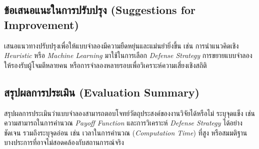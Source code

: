 \subsection{ข้อเสนอแนะในการปรับปรุง (Suggestions for Improvement)}
เสนอแนวทางปรับปรุงเพื่อให้แบบจำลองมีความยืดหยุ่นและแม่นยำยิ่งขึ้น เช่น  
การนำแนวคิดเชิง \textit{Heuristic} หรือ \textit{Machine Learning} มาใช้ในการเลือก \textit{Defense Strategy}  
การขยายแบบจำลองให้รองรับผู้โจมตีหลายคน หรือการจำลองหลายรอบเพื่อวิเคราะห์ความเสี่ยงเชิงสถิติ

\subsection{สรุปผลการประเมิน (Evaluation Summary)}
สรุปผลการประเมินว่าแบบจำลองสามารถตอบโจทย์วัตถุประสงค์ของงานวิจัยได้หรือไม่  
ระบุจุดแข็ง เช่น ความสามารถในการคำนวณ \textit{Payoff Function} และการวิเคราะห์ \textit{Defense Strategy} ได้อย่างชัดเจน  
รวมถึงระบุจุดอ่อน เช่น เวลาในการคำนวณ (\textit{Computation Time}) ที่สูง หรือสมมติฐานบางประการที่อาจไม่สอดคล้องกับสถานการณ์จริง
